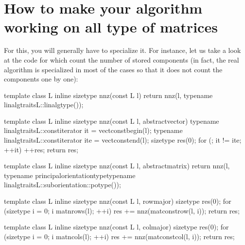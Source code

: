 \documentclass[a4paper,11pt,english]{sphinxmanual}
\begin{document}
\section{How to make your algorithm working on all type of matrices}
\label{\detokenize{gmm/inside:how-to-make-your-algorithm-working-on-all-type-of-matrices}}
\sphinxAtStartPar
For this, you will generally have to specialize it. For instance, let us take a look at the code for  which count the number of stored components (in fact, the real  algorithm is specialized in most of the cases so that it does not count the components one by one):

\begin{sphinxVerbatim}[commandchars=\\\{\}]
template \PYGZlt{}class L\PYGZgt{} inline size\PYGZus{}type nnz(const L\PYGZam{} l) \PYGZob{}
  return nnz(l, typename linalg\PYGZus{}traits\PYGZlt{}L\PYGZgt{}::linalg\PYGZus{}type());
\PYGZcb{}

template \PYGZlt{}class L\PYGZgt{} inline size\PYGZus{}type nnz(const L\PYGZam{} l, abstract\PYGZus{}vector) \PYGZob{}
  typename linalg\PYGZus{}traits\PYGZlt{}L\PYGZgt{}::const\PYGZus{}iterator it = vect\PYGZus{}const\PYGZus{}begin(l);
  typename linalg\PYGZus{}traits\PYGZlt{}L\PYGZgt{}::const\PYGZus{}iterator ite = vect\PYGZus{}const\PYGZus{}end(l);
  size\PYGZus{}type res(0);
  for (; it != ite; ++it) ++res;
  return res;
\PYGZcb{}

template \PYGZlt{}class L\PYGZgt{} inline size\PYGZus{}type nnz(const L\PYGZam{} l, abstract\PYGZus{}matrix) \PYGZob{}
  return nnz(l,  typename principal\PYGZus{}orientation\PYGZus{}type\PYGZlt{}typename
                 linalg\PYGZus{}traits\PYGZlt{}L\PYGZgt{}::sub\PYGZus{}orientation\PYGZgt{}::potype());
\PYGZcb{}

template \PYGZlt{}class L\PYGZgt{} inline size\PYGZus{}type nnz(const L\PYGZam{} l, row\PYGZus{}major) \PYGZob{}
  size\PYGZus{}type res(0);
  for (size\PYGZus{}type i = 0; i \PYGZlt{} mat\PYGZus{}nrows(l); ++i)
    res += nnz(mat\PYGZus{}const\PYGZus{}row(l, i));
  return res;
\PYGZcb{}

template \PYGZlt{}class L\PYGZgt{} inline size\PYGZus{}type nnz(const L\PYGZam{} l, col\PYGZus{}major) \PYGZob{}
  size\PYGZus{}type res(0);
  for (size\PYGZus{}type i = 0; i \PYGZlt{} mat\PYGZus{}ncols(l); ++i)
    res += nnz(mat\PYGZus{}const\PYGZus{}col(l, i));
  return res;
\PYGZcb{}
\end{sphinxVerbatim}
\end{document}
